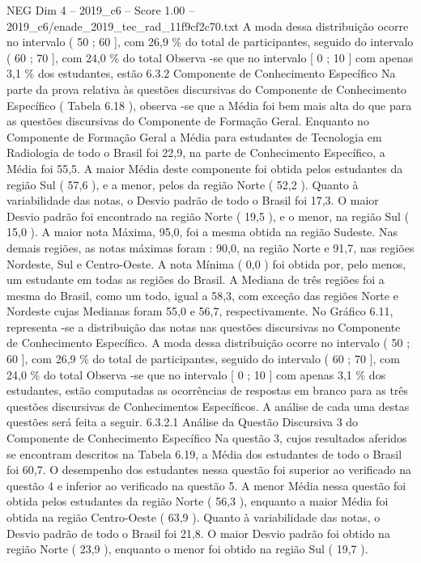 \begin{textsample}{NEG Dim 4 – 2019\_c6 – Score 1.00 – 2019\_c6/enade\_2019\_tec\_rad\_11f9cf2c70.txt}
A moda dessa distribuição ocorre no intervalo ( 50 ; 60 ], com 26,9 \% do total de participantes, seguido do intervalo ( 60 ; 70 ], com 24,0 \% do total Observa -se que no intervalo [ 0 ; 10 ] com apenas 3,1 \% dos estudantes, estão 6.3.2 Componente de Conhecimento Específico Na parte da prova relativa às questões discursivas do Componente de Conhecimento Específico ( Tabela 6.18 ), observa -se que a Média foi bem mais alta do que para as questões discursivas do Componente de Formação Geral.
Enquanto no Componente de Formação Geral a Média para estudantes de Tecnologia em Radiologia de todo o Brasil foi 22,9, na parte de Conhecimento Específico, a Média foi 55,5.
A maior Média deste componente foi obtida pelos estudantes da região Sul ( 57,6 ), e a menor, pelos da região Norte ( 52,2 ).
Quanto à variabilidade das notas, o Desvio padrão de todo o Brasil foi 17,3.
O maior Desvio padrão foi encontrado na região Norte ( 19,5 ), e o menor, na região Sul ( 15,0 ).
A maior nota Máxima, 95,0, foi a mesma obtida na região Sudeste.
Nas demais regiões, as notas máximas foram : 90,0, na região Norte e 91,7, nas regiões Nordeste, Sul e Centro-Oeste.
A nota Mínima ( 0,0 ) foi obtida por, pelo menos, um estudante em todas as regiões do Brasil.
A Mediana de três regiões foi a mesma do Brasil, como um todo, igual a 58,3, com exceção das regiões Norte e Nordeste cujas Medianas foram 55,0 e 56,7, respectivamente.
No Gráfico 6.11, representa -se a distribuição das notas nas questões discursivas no Componente de Conhecimento Específico.
A moda dessa distribuição ocorre no intervalo ( 50 ; 60 ], com 26,9 \% do total de participantes, seguido do intervalo ( 60 ; 70 ], com 24,0 \% do total Observa -se que no intervalo [ 0 ; 10 ] com apenas 3,1 \% dos estudantes, estão computadas as ocorrências de respostas em branco para as três questões discursivas de Conhecimentos Específicos.
A análise de cada uma destas questões será feita a seguir. 6.3.2.1 Análise da Questão Discursiva 3 do Componente de Conhecimento Específico Na questão 3, cujos resultados aferidos se encontram descritos na Tabela 6.19, a Média dos estudantes de todo o Brasil foi 60,7.
O desempenho dos estudantes nessa questão foi superior ao verificado na questão 4 e inferior ao verificado na questão 5.
A menor Média nessa questão foi obtida pelos estudantes da região Norte ( 56,3 ), enquanto a maior Média foi obtida na região Centro-Oeste ( 63,9 ).
Quanto à variabilidade das notas, o Desvio padrão de todo o Brasil foi 21,8.
O maior Desvio padrão foi obtido na região Norte ( 23,9 ), enquanto o menor foi obtido na região Sul ( 19,7 ).

\end{textsample}
